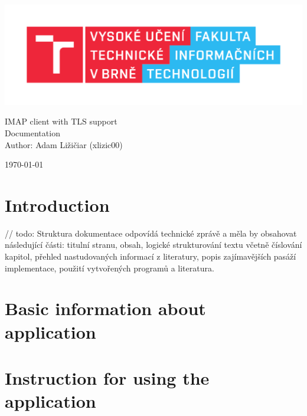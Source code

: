 \documentclass[a4paper, 11pt]{article}
\begin{document}
	\begin{titlepage}
		\begin{center}
			\includegraphics[width=0.77\linewidth]{res/logo_FIT.pdf} \\


			\Huge{IMAP client with TLS support} \\
			\LARGE{Documentation} \\
			\Large{Author: Adam Ližičiar (xlizic00)}
		\end{center}

		\begin{minipage}{0.4 \textwidth}
			{\Large \today}
		\end{minipage}
		\hfill
	\end{titlepage}



	\setcounter{page}{1}
	\tableofcontents
	\clearpage



	\setcounter{page}{1}

	\section{Introduction}

	// todo: Struktura dokumentace odpovídá technické zprávě a měla by obsahovat následující části: titulní stranu, obsah, logické strukturování textu včetně číslování kapitol, přehled nastudovaných informací z literatury, popis zajímavějších pasáží implementace, použití vytvořených programů a literatura.

	\section{Basic information about application}

	\section{Instruction for using the application}
\end{document}
